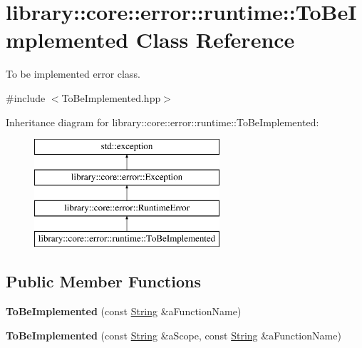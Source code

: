 \hypertarget{classlibrary_1_1core_1_1error_1_1runtime_1_1_to_be_implemented}{}\section{library\+:\+:core\+:\+:error\+:\+:runtime\+:\+:To\+Be\+Implemented Class Reference}
\label{classlibrary_1_1core_1_1error_1_1runtime_1_1_to_be_implemented}


To be implemented error class.  




{\ttfamily \#include $<$To\+Be\+Implemented.\+hpp$>$}

Inheritance diagram for library\+:\+:core\+:\+:error\+:\+:runtime\+:\+:To\+Be\+Implemented\+:\begin{figure}[H]
\begin{center}
\leavevmode
\includegraphics[height=4.000000cm]{classlibrary_1_1core_1_1error_1_1runtime_1_1_to_be_implemented}
\end{center}
\end{figure}
\subsection*{Public Member Functions}
\begin{DoxyCompactItemize}
\item 
\mbox{\label{classlibrary_1_1core_1_1error_1_1runtime_1_1_to_be_implemented_aee7854f221ff5bdade9cb8d67267b6ba}} 
{\bfseries To\+Be\+Implemented} (const \hyperlink{classlibrary_1_1core_1_1types_1_1_string}{String} \&a\+Function\+Name)
\item 
\mbox{\label{classlibrary_1_1core_1_1error_1_1runtime_1_1_to_be_implemented_a97439e9669fa5c1926de93fc0446f583}} 
{\bfseries To\+Be\+Implemented} (const \hyperlink{classlibrary_1_1core_1_1types_1_1_string}{String} \&a\+Scope, const \hyperlink{classlibrary_1_1core_1_1types_1_1_string}{String} \&a\+Function\+Name)
\end{DoxyCompactItemize}


